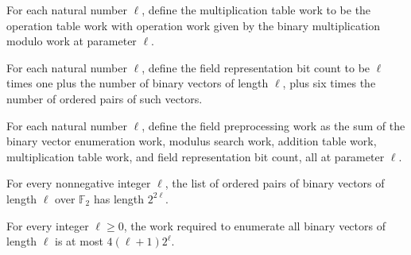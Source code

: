 \begin{definition}
\label{FABL.binaryMultiplicationTableWork}
\leanok
{}
For each natural number $\ell$, define the multiplication table work to be the operation
table work with operation work given by the binary multiplication modulo work at
parameter $\ell$.
\end{definition}

\begin{definition}
\label{FABL.binaryFieldRepresentationBits}
\leanok
{}
For each natural number $\ell$, define the field representation bit count to be $\ell$
times one plus the number of binary vectors of length $\ell$, plus six times the number
of ordered pairs of such vectors.
\end{definition}

\begin{definition}
\label{FABL.binaryFieldPreprocessingWork}
\leanok
{}
For each natural number $\ell$, define the field preprocessing work as the sum of the
binary vector enumeration work, modulus search work, addition table work, multiplication
table work, and field representation bit count, all at parameter $\ell$.
\end{definition}

\begin{theorem}
\label{FABL.length_binaryVectorPairs}
\leanok
{}
For every nonnegative integer $\ell$, the list of ordered pairs of binary vectors of
length $\ell$ over $\mathbb F_2$ has length $2^{2\ell}$.
\end{theorem}

\begin{theorem}
\label{FABL.binaryVectorEnumerationWork_le}
\leanok
{}
For every integer $\ell\ge 0$, the work required to enumerate all binary vectors of
length $\ell$ is at most $4(\ell+1)2^\ell$.
\end{theorem}

